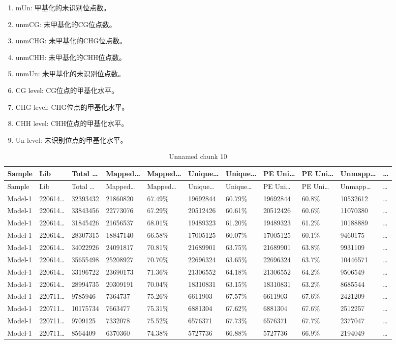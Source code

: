 \documentclass[
]{article}
\begin{document}
\begin{center}
\begin{tcolorbox}[colback=gray!10, colframe=gray!50, width=0.9\linewidth, arc=1mm, boxrule=0.5pt]
\begin{enumerate}
\item mUn:  甲基化的未识别位点数。
\item unmCG:  未甲基化的CG位点数。
\item unmCHG:  未甲基化的CHG位点数。
\item unmCHH:  未甲基化的CHH位点数。
\item unmUn:  未甲基化的未识别位点数。
\item CG level:  CG位点的甲基化水平。
\item CHG level:  CHG位点的甲基化水平。
\item CHH level:  CHH位点的甲基化水平。
\item Un level:  未识别位点的甲基化水平。
\end{enumerate}\end{tcolorbox}
\end{center}

\begin{longtable}[]{@{}lllllllllll@{}}
\caption{\label{tab:unnamed-chunk-10}Unnamed chunk 10}\tabularnewline
\toprule
Sample & Lib & Total \ldots{} & Mapped\ldots{} & Mapped\ldots{} & Unique\ldots{} & Unique\ldots{} & PE Uni\ldots{} & PE Uni\ldots{} & Unmapp\ldots{} & \ldots{}\tabularnewline
\midrule
\endfirsthead
\toprule
Sample & Lib & Total \ldots{} & Mapped\ldots{} & Mapped\ldots{} & Unique\ldots{} & Unique\ldots{} & PE Uni\ldots{} & PE Uni\ldots{} & Unmapp\ldots{} & \ldots{}\tabularnewline
\midrule
\endhead
Model-1 & 220614\ldots{} & 32393432 & 21860820 & 67.49\% & 19692844 & 60.79\% & 19692844 & 60.8\% & 10532612 & \ldots{}\tabularnewline
Model-1 & 220614\ldots{} & 33843456 & 22773076 & 67.29\% & 20512426 & 60.61\% & 20512426 & 60.6\% & 11070380 & \ldots{}\tabularnewline
Model-1 & 220614\ldots{} & 31845426 & 21656537 & 68.01\% & 19489323 & 61.20\% & 19489323 & 61.2\% & 10188889 & \ldots{}\tabularnewline
Model-1 & 220614\ldots{} & 28307315 & 18847140 & 66.58\% & 17005125 & 60.07\% & 17005125 & 60.1\% & 9460175 & \ldots{}\tabularnewline
Model-1 & 220614\ldots{} & 34022926 & 24091817 & 70.81\% & 21689901 & 63.75\% & 21689901 & 63.8\% & 9931109 & \ldots{}\tabularnewline
Model-1 & 220614\ldots{} & 35655498 & 25208927 & 70.70\% & 22696324 & 63.65\% & 22696324 & 63.7\% & 10446571 & \ldots{}\tabularnewline
Model-1 & 220614\ldots{} & 33196722 & 23690173 & 71.36\% & 21306552 & 64.18\% & 21306552 & 64.2\% & 9506549 & \ldots{}\tabularnewline
Model-1 & 220614\ldots{} & 28994735 & 20309191 & 70.04\% & 18310831 & 63.15\% & 18310831 & 63.2\% & 8685544 & \ldots{}\tabularnewline
Model-1 & 220711\ldots{} & 9785946 & 7364737 & 75.26\% & 6611903 & 67.57\% & 6611903 & 67.6\% & 2421209 & \ldots{}\tabularnewline
Model-1 & 220711\ldots{} & 10175734 & 7663477 & 75.31\% & 6881304 & 67.62\% & 6881304 & 67.6\% & 2512257 & \ldots{}\tabularnewline
Model-1 & 220711\ldots{} & 9709125 & 7332078 & 75.52\% & 6576371 & 67.73\% & 6576371 & 67.7\% & 2377047 & \ldots{}\tabularnewline
Model-1 & 220711\ldots{} & 8564409 & 6370360 & 74.38\% & 5727736 & 66.88\% & 5727736 & 66.9\% & 2194049 & \ldots{}\tabularnewline
\bottomrule
\end{longtable}

\begin{center}\vspace{1.5cm}\end{center}
\end{document}
